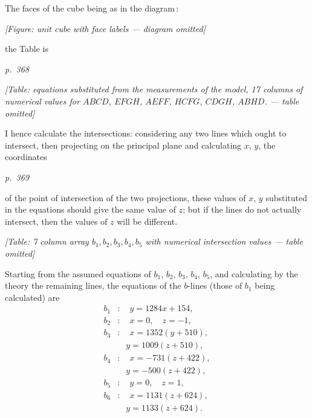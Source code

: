 \documentclass[11pt,a4paper]{book}
\begin{document}
The faces of the cube being as in the diagram\,:
\begin{center}
\textit{[Figure: unit cube with face labels --- diagram omitted]}
\end{center}
the Table is

\clearpage

\bigskip
\textit{p.~368}
\smallskip

\begin{center}
\textit{[Table: equations substituted from the measurements of the model, 17 columns of numerical}
\textit{values for $ABCD$, $EFGH$, $AEFF$, $HCFG$, $CDGH$, $ABHD$. --- table omitted]}
\end{center}

I hence calculate the intersections: considering any two lines which ought to
intersect, then projecting on the principal plane and calculating $x$, $y$, the coordinates

\clearpage

\bigskip
\textit{p.~369}
\smallskip

\noindent
of the point of intersection of the two projections, these values of $x$, $y$ substituted in
the equations should give the same value of $z$; but if the lines do not actually
intersect, then the values of $z$ will be different.

\begin{center}
\textit{[Table: 7 column array $b_1, b_2, b_3, b_4, b_5$ with numerical}
\textit{intersection values --- table omitted]}
\end{center}

Starting from the assumed equations of $b_1$, $b_2$, $b_3$, $b_4$, $b_5$, and calculating by the
theory the remaining lines, the equations of the $b$-lines (those of $b_1$ being calculated) are
\begin{align*}
b_1 &: \quad y = 1284 x + 154, \\
b_2 &: \quad x = 0, \quad z = -1, \\
b_3 &: \quad x = 1352(y + 510), \\
&\quad y = 1009(z + 510), \\
b_4 &: \quad x = -731(z + 422), \\
&\quad y = -500(z + 422), \\
b_5 &: \quad y = 0, \quad z = 1, \\
b_6 &: \quad x = 1131(z + 624), \\
&\quad y = 1133(z + 624).
\end{align*}

\clearpage
\end{document}
